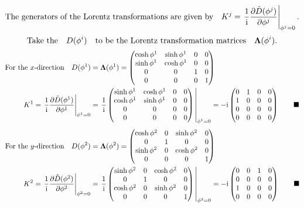 \documentclass{article}
\begin{document}
\[\qq*{The generators of the Lorentz transformations are given by}K^j=\eval{\frac{1}{\text{i}}\pdv{\hat{D}(\phi^j)}{\phi^j}}_{\phi^j=0}.\]
\[ \qq*{Take the} D(\phi^i) \qq{to be the Lorentz transformation matrices}\vb{\Lambda}(\phi^i).\]
\begin{align*}
\qq*{For the $x$-direction}D(\phi^1)&=\vb{\Lambda}(\phi^1)=\begin{pmatrix}
\cosh{\phi^1}&\sinh{\phi^1}&0&0\\
\sinh{\phi^1}&\cosh{\phi^1} & 0&0 \\ 
0 & 0&1&0\\
0&0&0&1
\end{pmatrix}\\
K^1=\eval{\frac{1}{\text{i}}\pdv{\hat{D}(\phi^1)}{\phi^1}}_{\phi^1=0}&=\eval{\frac{1}{\text{i}}\begin{pmatrix}
		\sinh{\phi^1}&\cosh{\phi^1}&0&0\\
		\cosh{\phi^1}&\sinh{\phi^1} & 0&0 \\ 
		0 & 0&0&0\\
		0&0&0&0
		\end{pmatrix}}_{\phi^1=0}=-\text{i}\begin{pmatrix}
		0&1&0&0\\
		1&0 & 0&0 \\ 
		0 & 0&0&0\\
		0&0&0&0
		\end{pmatrix}\qquad\blacksquare
\end{align*}\begin{align*}
\qq*{For the $y$-direction}D(\phi^2)&=\vb{\Lambda}(\phi^2)=\begin{pmatrix}
\cosh{\phi^2}&0&\sinh{\phi^2}&0\\
0&1 & 0&0 \\ 
\sinh{\phi^2} & 0&\cosh{\phi^2}&0\\
0&0&0&1
\end{pmatrix}\\
K^2=\eval{\frac{1}{\text{i}}\pdv{\hat{D}(\phi^2)}{\phi^2}}_{\phi^2=0}&=\eval{\frac{1}{\text{i}}\begin{pmatrix}
\sinh{\phi^2}&0&\cosh{\phi^2}&0\\
0&1 & 0&0 \\ 
\cosh{\phi^2} & 0&\sinh{\phi^2}&0\\
0&0&0&1
		\end{pmatrix}}_{\phi^2=0}=-\text{i}\begin{pmatrix}
		0&0&1&0\\
		0 & 0&0&0\\
		1&0 & 0&0 \\ 
		0&0&0&0
		\end{pmatrix}\qquad\blacksquare
\end{align*}
\end{document}
